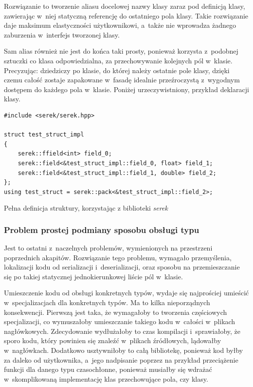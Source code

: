\documentclass[12pt]{article}
\newcommand{\n}{\newline}
\newcommand{\nonpl}[1]{{\it #1}}
\newcommand{\serek}{\nonpl{serek}}
\begin{document}
{{{				Rozwiązanie to tworzenie aliasu docelowej nazwy klasy zaraz pod definicją klasy, zawierając w~niej statyczną referencję do ostatniego pola klasy.
				Takie rozwiązanie daje maksimum elastyczności użytkownikowi, a~także nie wprowadza żadnego zaburzenia w~interfejs tworzonej klasy.\n

				Sam alias również nie jest do końca taki prosty, ponieważ korzysta z~podobnej sztuczki co klasa odpowiedzialna, za przechowywanie
				kolejnych pól w~klasie. Precyzując: dziedziczy po klasie, do której należy ostatnie pole klasy, dzięki czemu całość zostaje
				zapakowane w~fasadę idealnie przeźroczystą z~wygodnym dostępem do każdego pola w~klasie. Poniżej urzeczywistniony, przykład deklaracji klasy.\n

				\begin{captioned}[H]
					\begin{lstlisting}[frame=single]
#include <serek/serek.hpp>

struct test_struct_impl
{
	serek::ffield<int> field_0;
	serek::field<&test_struct_impl::field_0, float> field_1;
	serek::field<&test_struct_impl::field_1, double> field_2;
};
using test_struct = serek::pack<&test_struct_impl::field_2>;
					\end{lstlisting}
					\caption{ Pełna definicja struktury, korzystając z biblioteki \serek}
					\label{serek_full_example}
				\end{captioned}
			}

			{
				\subsubsection{Problem prostej podmiany sposobu obsługi typu}

				Jest to ostatni z~naczelnych problemów, wymienionych na przestrzeni poprzednich akapitów. Rozwiązanie tego problemu,
				wymagało przemyślenia, lokalizacji kodu od serializacji i~deserializacji, oraz sposobu na przemieszczanie się po takiej
				statycznej jednokierunkowej liście pól w~klasie.\n

				Umieszczenie kodu od obsługi konkretnych typów, wydaje się najprościej umieścić w~specjalizacjach dla konkretnych typów.
				Ma to kilka nieporządnych konsekwencji. Pierwszą jest taka, że wymagałoby to tworzenia częściowych specjalizacji, co
				wymuszałoby umieszczanie takiego kodu w~całości w~plikach nagłówkowych. Zdecydowanie wydłużałoby to czas kompilacji
				i~sprawiałoby, że sporo kodu, który powinien się znaleźć w~plikach źródłowych, lądowałby w~nagłówkach. Dodatkowo
				usztywniłoby to całą bibliotekę, ponieważ kod byłby za daleko od użytkownika, a~jego nadpisanie poprzez na przykład
				przeciążenie funkcji dla danego typu czasochłonne, ponieważ musiałby się wdrażać w~skomplikowaną implementację klas
				przechowujące pola, czy klasy.\n

}}}
\end{document}
